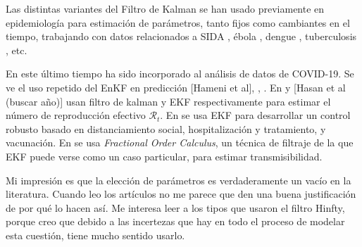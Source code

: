 Las distintas variantes del Filtro de Kalman se han usado previamente en epidemiología para estimación de parámetros, tanto fijos como cambiantes en el tiempo, trabajando con datos relacionados a SIDA \cite{Cazelles1997}, ébola \cite{Ndanguza2017}, dengue \cite{Torres-Signes2021}, tuberculosis \cite{Narula2016}, etc. %

En este último tiempo ha sido incorporado al análisis de datos de COVID-19. Se ve el uso repetido del EnKF en predicción [Hameni et al], \cite{Yang2020}, \cite{Song2021}. En \cite{Arroyo-Marioli2021} y \cite{Hasan2020} [Hasan et al (buscar año)] usan filtro de kalman y EKF respectivamente para estimar el número de reproducción efectivo \( \mathcal{R}_t \). En \cite{Rajaei2021} se usa EKF para desarrollar un control robusto basado en distanciamiento social, hospitalización y tratamiento, y vacunación. En \cite{Bansal2021} se usa \textit{Fractional Order Calculus}, un técnica de filtraje de la que EKF puede verse como un caso particular, para estimar transmisibilidad.





Mi impresión es que la elección de parámetros es verdaderamente un vacío en la literatura. Cuando leo los artículos no me parece que den una buena justificación de por qué lo hacen así. Me interesa leer a los tipos que usaron el filtro Hinfty, porque creo que debido a las incertezas que hay en todo el proceso de modelar esta cuestión, tiene mucho sentido usarlo.
